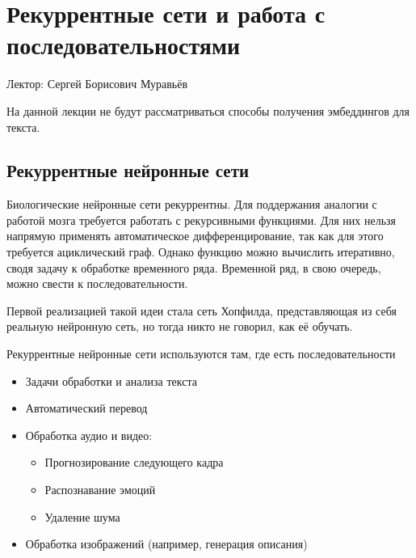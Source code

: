 \chapter{Рекуррентные сети и работа с последовательностями}

Лектор: Сергей Борисович Муравьёв

\begin{remark}
    На данной лекции не будут рассматриваться способы получения эмбеддингов для текста.
\end{remark}

\section{Рекуррентные нейронные сети}

Биологические нейронные сети рекуррентны. Для поддержания аналогии с работой мозга требуется работать с рекурсивными функциями. Для них нельзя напрямую применять автоматическое дифференцирование, так как для этого требуется ациклический граф. Однако функцию можно вычислить итеративно, сводя задачу к обработке временного ряда. Временной ряд, в свою очередь, можно свести к последовательности.

\begin{remark}
    Первой реализацией такой идеи стала сеть Хопфилда, представляющая из себя реальную нейронную сеть, но тогда никто не говорил, как её обучать.
\end{remark}

Рекуррентные нейронные сети используются там, где есть последовательности
\begin{itemize}
    \item Задачи обработки и анализа текста
    \item Автоматический перевод
    \item Обработка аудио и видео:
    \begin{itemize}
        \item Прогнозирование следующего кадра
        \item Распознавание эмоций
        \item Удаление шума
    \end{itemize}
    \item Обработка изображений (например, генерация описания)
\end{itemize}

